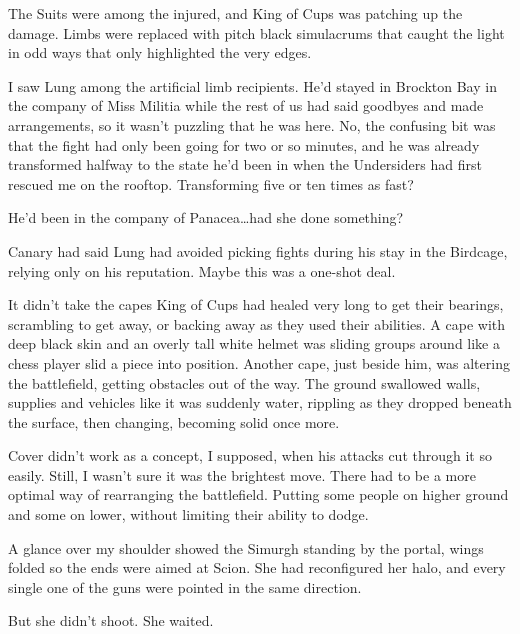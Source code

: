 The Suits were among the injured, and King of Cups was patching up the damage.  Limbs were replaced with pitch black simulacrums that caught the light in odd ways that only highlighted the very edges.



I saw Lung among the artificial limb recipients.  He'd stayed in Brockton Bay in the company of Miss Militia while the rest of us had said goodbyes and made arrangements, so it wasn't puzzling that he was here.  No, the confusing bit was that the fight had only been going for two or so minutes, and he was already transformed halfway to the state he'd been in when the Undersiders had first rescued me on the rooftop.  Transforming five or ten times as fast?



He'd been in the company of Panacea\ldots had she done something?



Canary had said Lung had avoided picking fights during his stay in the Birdcage, relying only on his reputation.  Maybe this was a one-shot deal.



It didn't take the capes King of Cups had healed very long to get their bearings, scrambling to get away, or backing away as they used their abilities.  A cape with deep black skin and an overly tall white helmet was sliding groups around like a chess player slid a piece into position.  Another cape, just beside him, was altering the battlefield, getting obstacles out of the way.  The ground swallowed walls, supplies and vehicles like it was suddenly water, rippling as they dropped beneath the surface, then changing, becoming solid once more.



Cover didn't work as a concept, I supposed, when his attacks cut through it so easily.  Still, I wasn't sure it was the brightest move.  There had to be a more optimal way of rearranging the battlefield.  Putting some people on higher ground and some on lower, without limiting their ability to dodge.



A glance over my shoulder showed the Simurgh standing by the portal, wings folded so the ends were aimed at Scion.  She had reconfigured her halo, and every single one of the guns were pointed in the same direction.



But she didn't shoot.  She waited.



